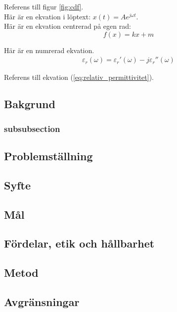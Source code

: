 
Referens till figur \ref{fig:cdf}.\\

Här är en ekvation i löptext: $x(t)=Ae^{j\omega t}$.\\

Här är en ekvation centrerad på egen rad: $$f(x)=kx+m$$

Här är en numrerad ekvation.
\begin{align}
	\varepsilon_r(\omega) = \varepsilon_r'(\omega) - j\varepsilon_r''(\omega)
	\label{eq:relativ_permittivitet}
\end{align}

Referens till ekvation (\ref{eq:relativ_permittivitet}).

\subsection{Bakgrund}

\subsubsection{subsubsection}

\subsection{Problemställning}

\subsection{Syfte}

\subsection{Mål}

\subsection{Fördelar, etik och hållbarhet}

\subsection{Metod}

\subsection{Avgränsningar}

